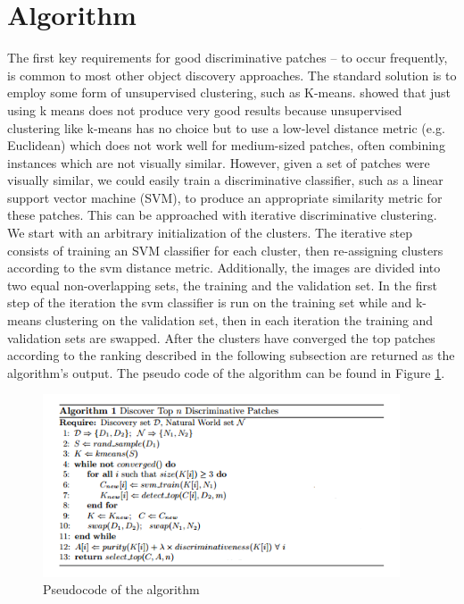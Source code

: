 \documentclass{article}
\begin{document}
\section{Algorithm}

The first key requirements for good discriminative patches – to occur frequently, is common to most other object discovery approaches. The
standard solution is to employ some form of unsupervised clustering, such as K-means. \cite{discr} showed that just using k means does not produce very good results because  unsupervised clustering
like k-means has no choice but to use a low-level distance metric (e.g. Euclidean) which does not work well for medium-sized patches, often combining instances which are not visually similar.
\newline \newline
However, given a set of patches were visually similar, we could easily train
a discriminative classifier, such as a linear support vector machine (SVM), to produce an appropriate similarity metric for these patches. This can be approached with iterative discriminative clustering. We start with an arbitrary initialization of the clusters. The iterative step consists of training an SVM classifier for each cluster, then re-assigning clusters according to the svm distance metric. Additionally, the images are divided into two equal non-overlapping sets, the training and the validation set. In the first step of the iteration the svm classifier is run on the training set while and k-means clustering on the validation set, then in each iteration the training and validation sets are swapped. After the clusters have converged the top patches according to the ranking described in the following subsection are returned as the algorithm's output. The pseudo code of the algorithm can be found in Figure \ref{fig:alg}.


\begin{figure}
\includegraphics[width=300pt]{alg.png}
  \caption{Pseudocode of the algorithm}
  \label{fig:alg}
\end{figure}
\end{document}
